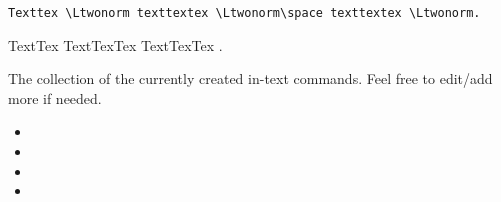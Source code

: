 \documentclass[../thesis.tex]{subfiles}
\begin{document}
\verb|Texttex \Ltwonorm texttextex \Ltwonorm\space texttextex \Ltwonorm.|

TextTex \Ltwonorm TextTexTex \Ltwonorm\space TextTexTex \Ltwonorm.

The collection of the currently created in-text commands. Feel free to edit/add more if needed. 
\begin{itemize}
    \item \Ltwonorm
    \item \LPnorm
    \item \GenNormX
    \item \GenNormH
\end{itemize}
\end{document}
